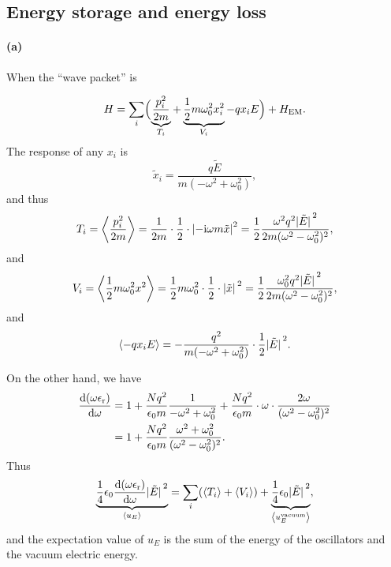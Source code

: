 \documentclass[hyperref, a4paper]{article}
\newcommand*{\ii}{\mathrm{i}}
\newcommand{\epsr}{\epsilon_{\text{r}}}
\begin{document}
\subsection{Energy storage and energy loss}

\paragraph{(a)} When the ``wave packet'' is 

\begin{equation}
    H = \sum_i \Bigl(
        \underbrace{
            \frac{p_i^2}{2m}
        }_{T_i} 
        + \underbrace{
            \frac{1}{2} m \omega_0^2 x_i^2
        }_{V_i} 
        - q x_i E
    \Bigr) + H_{\text{EM}}.
\end{equation}
The response of any $x_i$ is 
\begin{equation}
    \tilde{x}_i = \frac{q \tilde{E}}{m(- \omega^2 + \omega_0^2)},
\end{equation}
and thus 
\begin{equation}
    T_i = \expval{\frac{p_i^2}{2m}}
    = \frac{1}{2m} \cdot \frac{1}{2} \cdot  \abs{- \ii \omega m \tilde{x}}^2 
    = \frac{1}{2} \frac{\omega^2 q^2 \abs*{\tilde{E}}^2}{
        2 m (\omega^2 - \omega_0^2)^2
    },
\end{equation}
and 
\begin{equation}
    V_i = \expval{\frac{1}{2} m \omega_0^2 x^2}
    = \frac{1}{2} m \omega_0^2 \cdot \frac{1}{2} \cdot \abs*{\tilde{x}}^2 
    = \frac{1}{2} \frac{\omega_0^2 q^2 \abs*{\tilde{E}}^2}{
        2 m (\omega^2 - \omega_0^2)^2
    },
\end{equation}
and 
\begin{equation}
    \expval{- q x_i E} = - \frac{q^2}{m (- \omega^2 + \omega_0^2)} \cdot \frac{1}{2} \abs*{\tilde{E}}^2.
\end{equation}

On the other hand, we have 
\begin{equation}
    \begin{aligned}
        \dv{(\omega \epsr)}{\omega} &= 
        1 + \frac{N q^2}{\epsilon_0 m} \frac{1}{- \omega^2 + \omega_0^2}
        + \frac{N q^2}{\epsilon_0 m} \cdot \omega \cdot \frac{2 \omega}{(\omega^2 - \omega_0^2)^2} \\ 
        &= 1 + \frac{Nq^2}{\epsilon_0 m} \frac{
            \omega^2 + \omega_0^2
        }{(\omega^2 - \omega_0^2)^2}. 
    \end{aligned}
\end{equation}
Thus 
\begin{equation}
    \underbrace{
        \frac{1}{4} \epsilon_0 \dv{(\omega \epsr)}{\omega} \abs*{\tilde{E}}^2
    }_{\expval{u_E}} 
    = \sum_i (\expval{T_i} + \expval{V_i}) + \underbrace{
        \frac{1}{4} \epsilon_0 \abs*{\tilde{E}}^2
    }_{\expval{u_E^{\text{vacuum}}}} ,
\end{equation}
and the expectation value of $u_{E}$ is the sum 
of the energy of the oscillators and the vacuum electric energy.
\end{document}
